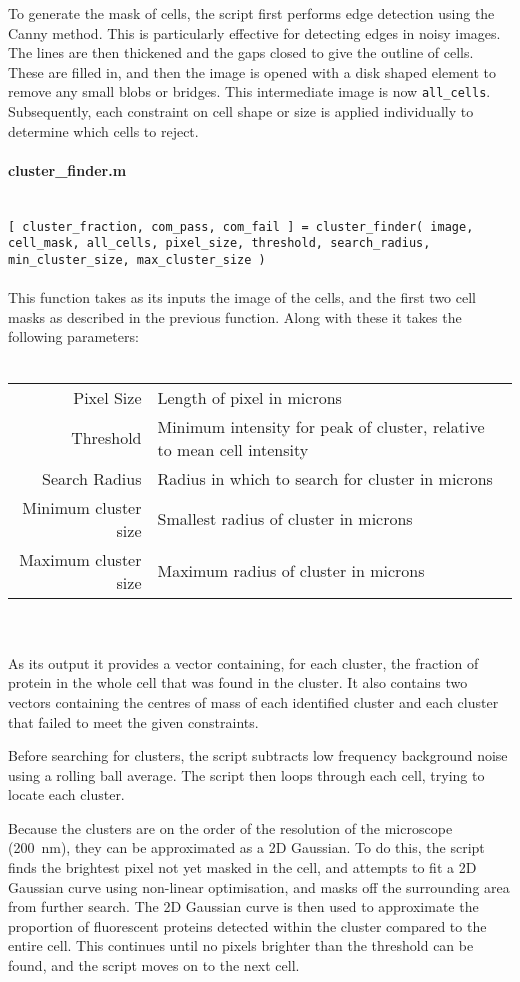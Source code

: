 \documentclass[../main.tex]{subfiles}
\begin{document}
To generate the mask of cells, the script first performs edge detection using the Canny method\cite{canny}. This is particularly effective for detecting edges in noisy images. The lines are then thickened and the gaps closed to give the outline of cells. These are filled in, and then the image is opened with a disk shaped element to remove any small blobs or bridges. This intermediate image is now \texttt{all\_cells}. Subsequently, each constraint on cell shape or size is applied individually to determine which cells to reject.


\paragraph{cluster\_finder.m}\ \\
\texttt{[ cluster\_fraction, com\_pass, com\_fail ] = cluster\_finder( image, cell\_mask, all\_cells, pixel\_size, threshold, search\_radius, min\_cluster\_size, max\_cluster\_size ) }
\\\\
This function takes as its inputs the image of the cells, and the first two cell masks as described in the previous function. Along with these it takes the following parameters:
\\\\
\begin{tabular}{rl}
Pixel Size		&	Length of pixel in microns\\
Threshold		&	Minimum intensity for peak of cluster, relative to mean cell intensity\\
Search Radius 	&	Radius in which to search for cluster in microns\\
Minimum cluster size	&	Smallest radius of cluster in microns\\
Maximum cluster size	&	Maximum radius of cluster in microns
\end{tabular}
\\\\
As its output it provides a vector containing, for each cluster, the fraction of protein in the whole cell that was found in the cluster. It also contains two vectors containing the centres of mass of each identified cluster and each cluster that failed to meet the given constraints.

Before searching for clusters, the script subtracts low frequency background noise using a rolling ball average. The script then loops through each cell, trying to locate each cluster.

Because the clusters are on the order of the resolution of the microscope (\SI{200}{\nano\meter}), they can be approximated as a 2D Gaussian. To do this, the script finds the brightest pixel not yet masked in the cell, and attempts to fit a 2D Gaussian curve using non-linear optimisation, and masks off the surrounding area from further search. The 2D Gaussian curve is then used to approximate the proportion of fluorescent proteins detected within the cluster compared to the entire cell. This continues until no pixels brighter than the threshold can be found, and the script moves on to the next cell.
\end{document}
